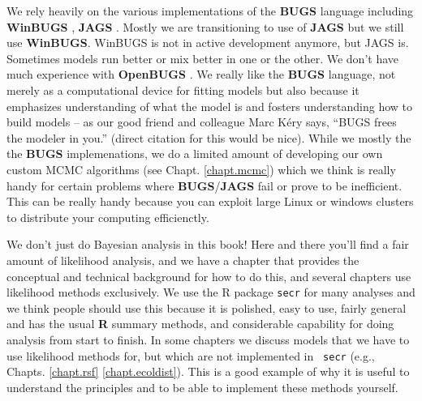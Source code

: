 We rely heavily on the various implementations of the {\bf BUGS}
language including {\bf WinBUGS} \citep{lunn_etal:2000}, {\bf JAGS}
\citep{plummer:2003}.  Mostly we are transitioning to use of {\bf
  JAGS} but we still use {\bf WinBUGS}.  WinBUGS is not in active
development anymore, but JAGS is. Sometimes models run better or mix
better in one or the other. We don't have much experience with {\bf
  OpenBUGS} \citep{thomas_etal:2006}. We really like the {\bf BUGS}
language, not merely as a computational device for fitting models but
also because it emphasizes understanding of what the model is and
fosters understanding how to build models -- as our good friend and
colleague Marc K\'{e}ry says, ``BUGS frees the modeler in you.''
(direct citation for this would be nice).
While we mostly the the {\bf BUGS} implemenations, we do a limited
amount of developing our own custom MCMC algorithms (see
Chapt. \ref{chapt.mcmc}) which we think is really handy for certain
problems where {\bf BUGS}/{\bf JAGS} fail or prove to be inefficient.
This can be really handy because you can exploit large Linux or
windows clusters to distribute your computing efficienctly.

We don't just do Bayesian analysis in this book! Here and there you'll
find a fair amount of likelihood analysis, and we have a chapter that
provides the conceptual and technical background for how to do this,
and several chapters use likelihood methods exclusively. We use the R
package \mbox{\tt secr} \citep{efford_etal:2009euring} for many
analyses and we think people should use this because it is polished,
easy to use, fairly general and has the usual {\bf R} summary methods,
and considerable capability for doing analysis from start to
finish. In some chapters we discuss models that we have to use
likelihood methods for, but which are not implemented in \mbox{\tt
  secr} (e.g., Chapts. \ref{chapt.rsf} \ref{chapt.ecoldist}). This is
a good example of why it is useful to understand the principles and to
be able to implement these methods yourself.


